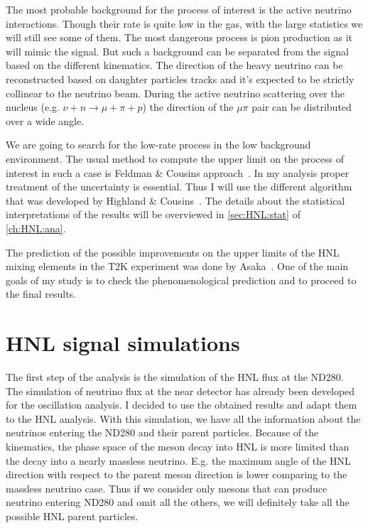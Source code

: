 \documentclass[../main.tex]{subfiles}
\begin{document}
The most probable background for the process of interest is the active neutrino interactions. Though their rate is quite low in the gas, with the large statistics we will still see some of them. The most dangerous process is pion production as it will mimic the signal. But such a background can be separated from the signal based on the different kinematics. The direction of the heavy neutrino can be reconstructed based on daughter particles tracks and it's expected to be strictly collinear to the neutrino beam. During the active neutrino scattering over the nucleus (e.g. $\nu+n\to\mu+\pi+p$) the direction of the $\mu\pi$ pair can be distributed over a wide angle.

\begin{comment}
It happens because of the nuclear effects such as Fermi motion and secondary interactions in nuclei (\autoref{sec:intro:nuclei} of \autoref{ch:nu_phys}). Thus the background can be further reduced with the kinematics cuts. The detailed analysis of the background will be presented in \autoref{sec:HNL:bg} of \autoref{ch:HNL:ana}.
\end{comment}

We are going to search for the low-rate process in the low background environment. The usual method to compute the upper limit on the process of interest in such a case is Feldman \& Cousins approach~\cite{Cousins1998}. In my analysis proper treatment of the uncertainty is essential. Thus I will use the different algorithm that was developed by Highland \& Cousins~\cite{Cousins1992}. The details about the statistical interpretations of the results will be overviewed in \autoref{sec:HNL:stat} of \autoref{ch:HNL:ana}.

The prediction of the possible improvements on the upper limits of the HNL mixing elements in the T2K experiment was done by Asaka~\cite{Asaka2012}. One of the main goals of my study is to check the phenomenological prediction and to proceed to the final results.


\chapter{HNL signal simulations}
\label{ch:HNL:HNLsim}
The first step of the analysis is the simulation of the HNL flux at the ND280. The simulation of neutrino flux at the near detector has already been developed for the oscillation analysis. I decided to use the obtained results and adapt them to the HNL analysis. With this simulation, we have all the information about the neutrinos entering the ND280 and their parent particles. Because of the kinematics, the phase space of the meson decay into HNL is more limited than the decay into a nearly massless neutrino. E.g. the maximum angle of the HNL direction with respect to the parent meson direction is lower comparing to the massless neutrino case. Thus if we consider only mesons that can produce neutrino entering ND280 and omit all the others, we will definitely take all the possible HNL parent particles.
\end{document}
